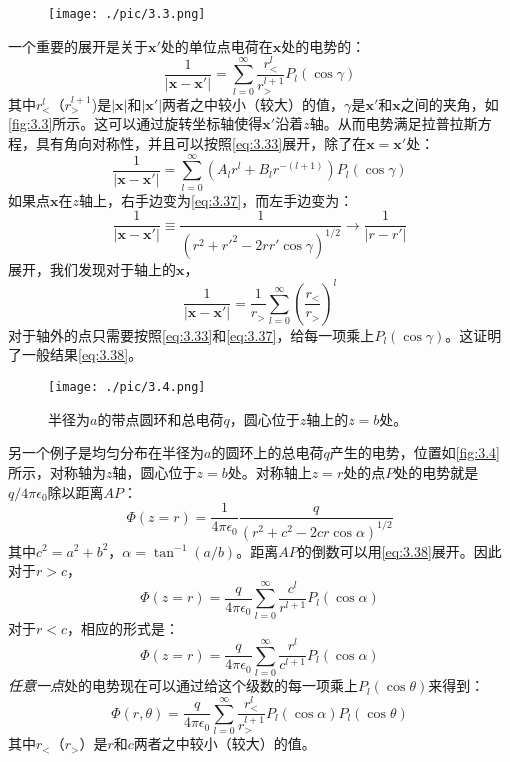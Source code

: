 \documentclass[12pt]{book}
\numberwithin{equation}{chapter}
\numberwithin{figure}{chapter}
\numberwithin{footnote}{page}
\begin{document}
\begin{figure}[!ht]
    \centering
    \texttt{[image: ./pic/3.3.png]}
    \captionsetup{justification=raggedright, singlelinecheck=false}
    \caption{}
    \label{fig:3.3}
\end{figure}

一个重要的展开是关于$\mathbf{x'}$处的单位点电荷在$\mathbf{x}$处的电势的：
\begin{equation}\label{eq:3.38}
    \frac{1}{|\mathbf{x}-\mathbf{x'}|}=\sum_{l=0}^\infty \frac{r^l_<}{r^{l+1}_>}P_l(\cos\gamma)
\end{equation}
其中$r^l_<$（$r^{l+1}_>$)是$|\mathbf{x}|$和$|\mathbf{x'}|$两者之中较小（较大）的值，$\gamma$是$\mathbf{x'}$和$\mathbf{x}$之间的夹角，如\autoref{fig:3.3}所示。这可以通过旋转坐标轴使得$\mathbf{x'}$沿着$z$轴。从而电势满足拉普拉斯方程，具有角向对称性，并且可以按照\autoref{eq:3.33}展开，除了在$\mathbf{x}=\mathbf{x'}$处：
$$\frac{1}{|\mathbf{x}-\mathbf{x'}|}=\sum_{l=0}^\infty (A_lr^l+B_lr^{-(l+1)})P_l(\cos\gamma)$$
如果点$\mathbf{x}$在$z$轴上，右手边变为\autoref{eq:3.37}，而左手边变为：
$$\frac{1}{|\mathbf{x}-\mathbf{x'}|}\equiv\frac{1}{(r^2+r'^2-2rr'\cos\gamma)^{1/2}}\to\frac{1}{|r-r'|}$$
展开，我们发现对于轴上的$\mathbf{x}$，
$$\frac{1}{|\mathbf{x}-\mathbf{x'}|}=\frac{1}{r_>}\sum_{l=0}^\infty (\frac{r_<}{r_>})^l$$
对于轴外的点只需要按照\autoref{eq:3.33}和\autoref{eq:3.37}，给每一项乘上$P_l(\cos\gamma)$。这证明了一般结果\autoref{eq:3.38}。

\begin{figure}[!ht]
    \centering
    \texttt{[image: ./pic/3.4.png]}
    \captionsetup{justification=raggedright, singlelinecheck=false}
    \caption{半径为$a$的带点圆环和总电荷$q$，圆心位于$z$轴上的$z=b$处。}
    \label{fig:3.4}
\end{figure}

另一个例子是均匀分布在半径为$a$的圆环上的总电荷$q$产生的电势，位置如\autoref{fig:3.4}所示，对称轴为$z$轴，圆心位于$z=b$处。对称轴上$z=r$处的点$P$处的电势就是$q/4\pi\epsilon_0$除以距离$AP$：
$$\Phi(z=r)=\frac{1}{4\pi\epsilon_0}\frac{q}{(r^2+c^2-2cr\cos\alpha)^{1/2}}$$
其中$c^2=a^2+b^2$，$\alpha=\tan^{-1}(a/b)$。距离$AP$的倒数可以用\autoref{eq:3.38}展开。因此对于$r>c$，
$$\Phi(z=r)=\frac{q}{4\pi\epsilon_0}\sum_{l=0}^\infty \frac{c^l}{r^{l+1}}P_l(\cos\alpha)$$
对于$r<c$，相应的形式是：
$$\Phi(z=r)=\frac{q}{4\pi\epsilon_0}\sum_{l=0}^\infty \frac{r^l}{c^{l+1}}P_l(\cos\alpha)$$
\textit{任意一点}处的电势现在可以通过给这个级数的每一项乘上$P_l(\cos\theta)$来得到：
$$\Phi(r,\theta)=\frac{q}{4\pi\epsilon_0}\sum_{l=0}^\infty \frac{r_<^l}{r_>^{l+1}}P_l(\cos\alpha)P_l(\cos\theta)$$
其中$r_<$（$r_>$）是$r$和$c$两者之中较小（较大）的值。
\end{document}
